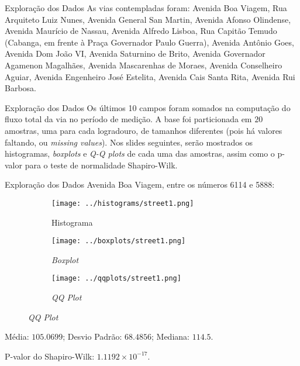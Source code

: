 \begin{frame}{Exploração dos Dados}
As vias contempladas foram: Avenida Boa Viagem, Rua Arquiteto Luiz Nunes,
Avenida General San Martin, Avenida Afonso Olindense, Avenida Maurício de
Nassau, Avenida Alfredo Lisboa, Rua Capitão Temudo (Cabanga, em frente à Praça
Governador Paulo Guerra), Avenida Antônio Goes, Avenida Dom João VI, Avenida
Saturnino de Brito, Avenida Governador Agamenon Magalhães, Avenida Mascarenhas
de Moraes, Avenida Conselheiro Aguiar, Avenida Engenheiro José Estelita, Avenida
Cais Santa Rita, Avenida Rui Barbosa.
\end{frame}

\begin{frame}{Exploração dos Dados}
Os últimos 10 campos foram somados na computação do fluxo total da via no
período de medição.
\vskip 0.5cm
A base foi particionada em $20$ amostras, uma para cada logradouro, de tamanhos
diferentes (pois há valores faltando, ou \textit{missing values}).
\vskip 0.5cm
Nos slides seguintes, serão mostrados os histogramas, \textit{boxplots} e
\textit{Q-Q plots} de cada uma das amostras, assim como o p-valor para o teste
de normalidade Shapiro-Wilk.
\end{frame}


\begin{frame}{Exploração dos Dados}
Avenida Boa Viagem, entre os números 6114 e 5888:
\vskip 0.05cm
\begin{figure}
	\centering
	\begin{subfigure}{.33\textwidth}
		\centering
		\texttt{[image: ../histograms/street1.png]}
		\caption*{Histograma}
	\end{subfigure}%
	\begin{subfigure}{.33\textwidth}
		\centering
		\texttt{[image: ../boxplots/street1.png]}
		\caption*{\textit{Boxplot}}
	\end{subfigure}
	\begin{subfigure}{.32\textwidth}
		\centering
		\texttt{[image: ../qqplots/street1.png]}
		\caption*{\textit{QQ Plot}}
	\end{subfigure}
\end{figure}
\vskip 0.05cm
Média: $105.0699$; Desvio Padrão: $68.4856$; Mediana: $114.5$.

P-valor do Shapiro-Wilk: $1.1192 \times 10^{-17}$.
\end{frame}

